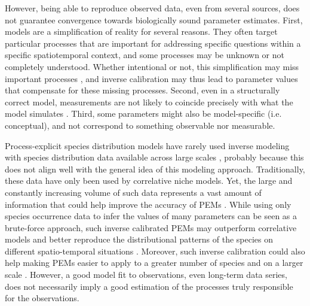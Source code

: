\documentclass[letterpaper,8pt]{extarticle}  %
\begin{document}
\begin{doublespacing}
\begin{linenumbers}
However, being able to reproduce observed data, even from several sources, does not guarantee convergence towards biologically sound parameter estimates. First, models are a simplification of reality for several reasons. They often target particular processes that are important for addressing specific questions within a specific spatiotemporal context, and some processes may be unknown or not completely understood. Whether intentional or not, this simplification may miss important processes \citep{Forrester2021}, and inverse calibration may thus lead to parameter values that compensate for these missing processes. Second, even in a structurally correct model, measurements are not likely to coincide precisely with what the model simulates \citep{Zhang2024}. Third, some parameters might also be model-specific (i.e. conceptual), and not correspond to something observable nor measurable.

Process-explicit species distribution models have rarely used inverse modeling with species distribution data available across large scales \citep{Higgins2012, VanderMeersch2023}, probably because this does not align well with the general idea of this modeling approach. Traditionally, these data have only been used by correlative niche models. Yet, the large and constantly increasing volume of such data \citep{Feng2022} represents a vast amount of information that could help improve the accuracy of PEMs \citep{Evans2016}. While using only species occurrence data to infer the values of many parameters can be seen as a brute-force approach, such inverse calibrated PEMs may outperform correlative models and better reproduce the distributional patterns of the species on different spatio-temporal situations \citep{Higgins2020, VanderMeersch2024}.  Moreover, such inverse calibration could also help making PEMs easier to apply to a greater number of species and on a larger scale \citep[e.g.][]{Conradi2024}. However, a good model fit to observations, even long-term data series, does not necessarily imply a good estimation of the processes truly responsible for the observations. 


\end{linenumbers}
\end{doublespacing}
\end{document}
